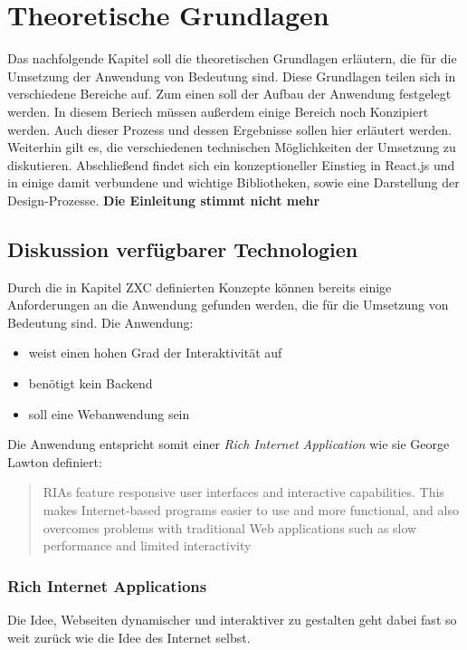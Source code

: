 \chapter{Theoretische Grundlagen}
\thispagestyle{fancy}
Das nachfolgende Kapitel soll die theoretischen Grundlagen erläutern, die für die Umsetzung der Anwendung von Bedeutung sind. Diese Grundlagen teilen sich in verschiedene Bereiche auf. Zum einen soll der Aufbau der Anwendung festgelegt werden. In diesem Beriech müssen außerdem einige Bereich noch Konzipiert werden. Auch dieser Prozess und dessen Ergebnisse sollen hier erläutert werden.
Weiterhin gilt es, die verschiedenen technischen Möglichkeiten der Umsetzung zu diskutieren. Abschließend findet sich ein konzeptioneller Einstieg in React.js und in einige damit verbundene und wichtige Bibliotheken, sowie eine Darstellung der Design-Prozesse.
\textbf{Die Einleitung stimmt nicht mehr}

\section{Diskussion verfügbarer Technologien}
Durch die in Kapitel ZXC definierten Konzepte können bereits einige Anforderungen an die Anwendung gefunden werden, die für die Umsetzung von Bedeutung sind.
Die Anwendung:

\begin{itemize}
  \item weist einen hohen Grad der Interaktivität auf
  \item benötigt kein Backend
  \item soll eine Webanwendung sein
\end{itemize}

Die Anwendung entspricht somit einer \textit{Rich Internet Application} wie sie George Lawton definiert:

\begin{quote}
  RIAs feature responsive user interfaces and interactive capabilities. This makes Internet-based programs easier to use and more functional, and also overcomes problems with traditional Web applications such as slow performance and limited interactivity \cite{lawton2008new}
\end{quote}

\subsection{Rich Internet Applications}
Die Idee, Webseiten dynamischer und interaktiver zu gestalten geht dabei fast so weit zurück wie die Idee des Internet selbst.

